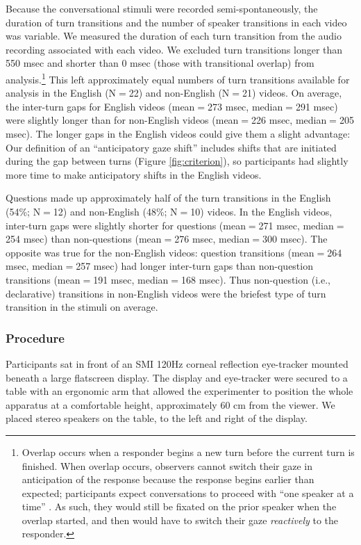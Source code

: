 \documentclass[authoryear, 12pt]{elsarticle}
\begin{document}
Because the conversational stimuli were recorded semi-spontaneously, the duration of turn transitions and the number of speaker transitions in each video was variable. We measured the duration of each turn transition from the audio recording associated with each video. We excluded turn transitions longer than 550 msec and shorter than 0 msec (those with transitional overlap) from analysis.\footnote{Overlap occurs when a responder begins a new turn before the current turn is finished. When overlap occurs, observers cannot switch their gaze in anticipation of the response because the response begins earlier than expected; participants expect conversations to proceed with ``one speaker at a time'' \citep{sacks1974}. As such, they would still be fixated on the prior speaker when the overlap started, and then would have to switch their gaze \textit{reactively} to the responder.} This left approximately equal numbers of turn transitions available for analysis in the English (N$=$22) and non-English (N$=$21) videos. On average, the inter-turn gaps for English videos (mean$=$273 msec, median$=$291 msec) were slightly longer than for non-English videos (mean$=$226 msec, median$=$205 msec). The longer gaps in the English videos could give them a slight advantage: Our definition of an ``anticipatory gaze shift'' includes shifts that are initiated during the gap between turns (Figure \ref{fig:criterion}), so participants had slightly more time to make anticipatory shifts in the English videos.

Questions made up approximately half of the turn transitions in the English (54\%; N$=$12) and non-English (48\%; N$=$10) videos. In the English videos, inter-turn gaps were slightly shorter for questions (mean$=$271 msec, median$=$254 msec) than non-questions (mean$=$276 msec, median$=$300 msec). The opposite was true for the non-English videos: question transitions (mean$=$264 msec, median$=$257 msec) had longer inter-turn gaps than non-question transitions (mean$=$191 msec, median$=$168 msec). Thus non-question (i.e., declarative) transitions in non-English videos were the briefest type of turn transition in the stimuli on average.

\subsubsection{Procedure} 
Participants sat in front of an SMI 120Hz corneal reflection eye-tracker mounted beneath a large flatscreen display. The display and eye-tracker were secured to a table with an ergonomic arm that allowed the experimenter to position the whole apparatus at a comfortable height, approximately 60 cm from the viewer. We placed stereo speakers on the table, to the left and right of the display. 
\end{document}
